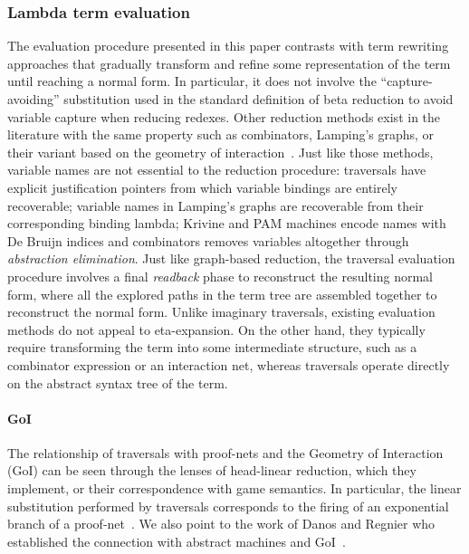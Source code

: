 \documentclass[xchauthor,chkrefs,GCNS,amsmath,amsthm,rotating,leaveRGB]{tcsg}
\theoremstyle{plain}
\theoremstyle{definition}
\begin{document}
\subsubsection{Lambda term evaluation}\label{sec1.3.4}

The evaluation procedure presented in this paper contrasts with term
rewriting approaches that gradually transform and refine some representation
of the term until reaching a normal form. In particular, it does not involve
the ``capture-avoiding'' substitution used in the standard definition of beta
reduction to avoid variable capture when reducing redexes. Other reduction
methods exist in the literature with the same property such as combinators,
Lamping's graphs, or their variant based on the geometry of
interaction~\cite{Lamping:1989:AOL:96709.96711,Gonthier:1992:GOL:143165.143172,curry_combinatorylogic,Barendregt84,b24}.
Just like those methods, variable names are not essential to the reduction
procedure: traversals have explicit justification pointers from which
variable bindings are entirely recoverable; variable names in Lamping's
graphs are recoverable from their corresponding binding lambda; Krivine and
PAM machines encode names with De Bruijn indices and combinators removes
variables altogether through \emph{abstraction elimination}. Just like
graph-based reduction, the traversal evaluation procedure involves a final
\emph{readback} phase to reconstruct the resulting normal form, where all the
explored paths in the term tree are assembled together to reconstruct the
normal form. Unlike imaginary traversals, existing evaluation methods do not
appeal to eta-expansion. On the other hand, they typically require
transforming the term into some intermediate structure, such as a combinator
expression or an interaction net, whereas traversals operate directly on the
abstract syntax tree of the term.

\paragraph*{GoI}
The relationship of traversals with proof-nets and the Geometry of
Interaction (GoI) can be seen through the lenses of head-linear reduction,
which they implement, or their correspondence with game semantics. In
particular, the linear substitution performed by traversals corresponds to
the firing of an exponential branch of a proof-net~\cite{MASCARI1994111}. We
also point to the work of Danos and Regnier who established the connection
with abstract machines and GoI~\cite{danosherbelinregnier1996}.
\end{document}
